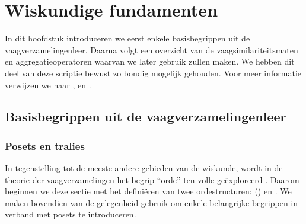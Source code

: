 \chapter{Wiskundige fundamenten}

In dit hoofdstuk introduceren we eerst enkele basisbegrippen uit de vaagverzamelingenleer. 
Daarna volgt een overzicht van de vaagsimilariteitsmaten en aggregatieoperatoren waarvan
we later gebruik zullen maken. We hebben dit deel van deze scriptie bewust zo 
bondig mogelijk gehouden. Voor meer informatie verwijzen
we naar \cite{kerre:vaagmodellen}, \cite{vanderweken:similariteitsmaten} en 
\cite{detyniecki:numerical_aggregation_operators}.


\section{Basisbegrippen uit de vaagverzamelingenleer}

\subsection{Posets en tralies}
\label{sectie:posets_en_tralies}

In tegenstelling tot de meeste andere gebieden van de wiskunde, wordt in de theorie der 
vaagverzamelingen het begrip ``orde'' ten volle ge\"exploreerd \cite{kerre:vaagmodellen}. Daarom beginnen we deze 
sectie met het defini\"eren van twee ordestructuren:  
() en . We maken bovendien van de gelegenheid gebruik om enkele 
belangrijke begrippen in verband met posets te introduceren. 

